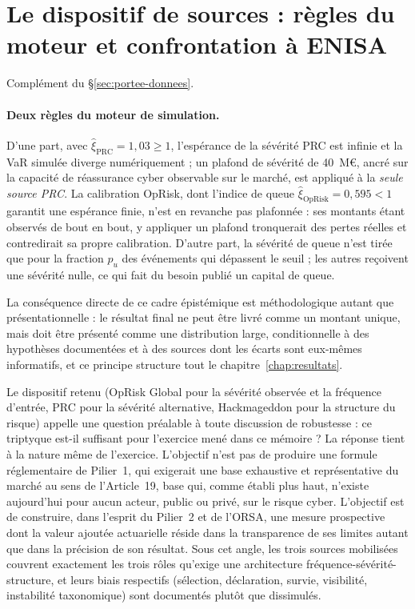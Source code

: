 \section{Le dispositif de sources : règles du moteur et confrontation à ENISA}
\label{sec:ann-sources}


Complément du \S\ref{sec:portee-donnees}.

\paragraph{Deux règles du moteur de simulation.} D'une part, avec $\hat{\xi}_{\text{PRC}} =
1{,}03 \geq 1$, l'espérance de la sévérité PRC est infinie et la VaR simulée
diverge numériquement ; un plafond de sévérité de 40~M\euro, ancré sur la
capacité de réassurance cyber observable sur le marché, est appliqué à la
\emph{seule source PRC}. La calibration OpRisk, dont l'indice de queue
$\hat{\xi}_{\text{OpRisk}} = 0{,}595 < 1$ garantit une espérance finie, n'est
en revanche pas plafonnée : ses montants étant observés de bout en bout, y
appliquer un plafond tronquerait des pertes réelles et contredirait sa propre
calibration. D'autre part, la sévérité de queue n'est tirée que pour la
fraction $p_u$ des événements qui dépassent le seuil ; les autres reçoivent une
sévérité nulle, ce qui fait du besoin publié un capital de queue.

La conséquence directe de ce cadre épistémique est méthodologique autant que
présentationnelle : le résultat final ne peut être livré comme un montant
unique, mais doit être présenté comme une distribution large, conditionnelle
à des hypothèses documentées et à des sources dont les écarts sont eux-mêmes
informatifs, et ce principe structure tout le chapitre~\ref{chap:resultats}.



Le dispositif retenu (OpRisk Global pour la sévérité observée et la fréquence
d'entrée, PRC pour la sévérité alternative, Hackmageddon pour la structure du
risque) appelle une
question préalable à toute discussion de robustesse : ce triptyque est-il
suffisant pour l'exercice mené dans ce mémoire ? La réponse tient à la nature
même de l'exercice. L'objectif n'est pas de produire une formule
réglementaire de Pilier~1, qui exigerait une base exhaustive et représentative
du marché au sens de l'Article~19, base qui, comme établi plus haut, n'existe aujourd'hui
pour aucun acteur, public ou privé, sur le
risque cyber. L'objectif est de construire, dans l'esprit du Pilier~2 et de
l'ORSA, une mesure prospective dont la valeur ajoutée actuarielle réside dans
la transparence de ses limites autant que dans la précision de son résultat.
Sous cet angle, les trois sources mobilisées couvrent exactement les trois
rôles qu'exige une architecture fréquence-sévérité-structure, et leurs biais
respectifs (sélection, déclaration, survie, visibilité, instabilité
taxonomique) sont documentés plutôt que dissimulés.


